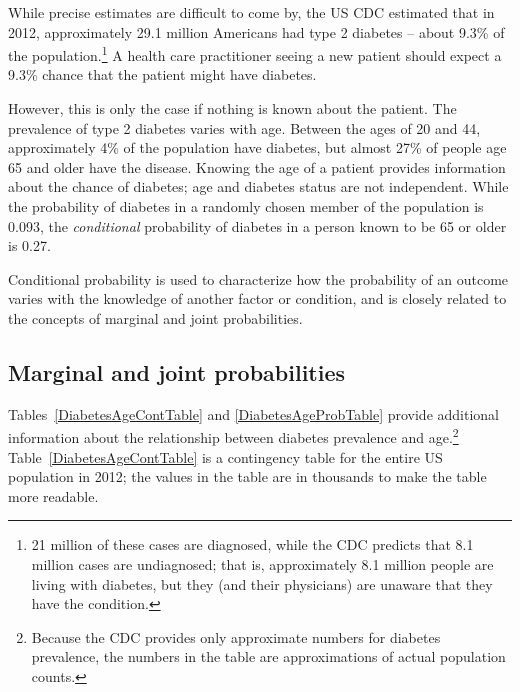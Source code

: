 While precise estimates are difficult to come by, the US CDC estimated that in 2012, approximately 29.1 million Americans had type 2 diabetes -- about 9.3\% of the population.\footnote{21 million of these cases are diagnosed, while the CDC predicts that 8.1 million cases are undiagnosed; that is, approximately 8.1 million people are living with diabetes, but they (and their physicians) are unaware that they have the condition.} A health care practitioner seeing a new patient should expect a 9.3\% chance that the patient might have diabetes. 

However, this is only the case if nothing is known about the patient. The prevalence of type 2 diabetes varies with age. Between the ages of 20 and 44, approximately 4\% of the population have diabetes, but almost 27\% of people age 65 and older have the disease. Knowing the age of a patient provides information about the chance of diabetes; age and diabetes status are not independent. While the probability of diabetes in a randomly chosen member of the population is 0.093, the \textit{conditional} probability of diabetes in a person known to be 65 or older is 0.27.

Conditional probability is used to  characterize how the probability of an outcome varies with the knowledge of another factor or condition, and is closely related to the concepts of marginal and joint probabilities.

\subsection{Marginal and joint probabilities}
\label{marginalAndJointProbabilities}



Tables~\ref{DiabetesAgeContTable} and \ref{DiabetesAgeProbTable} provide additional information about the relationship between diabetes prevalence and age.\footnote{Because the CDC provides only approximate numbers for diabetes prevalence, the numbers in the table are approximations of actual population counts.} Table~\ref{DiabetesAgeContTable} is a contingency table for the entire US population in 2012; the values in the table are in thousands to make the table more readable.  

